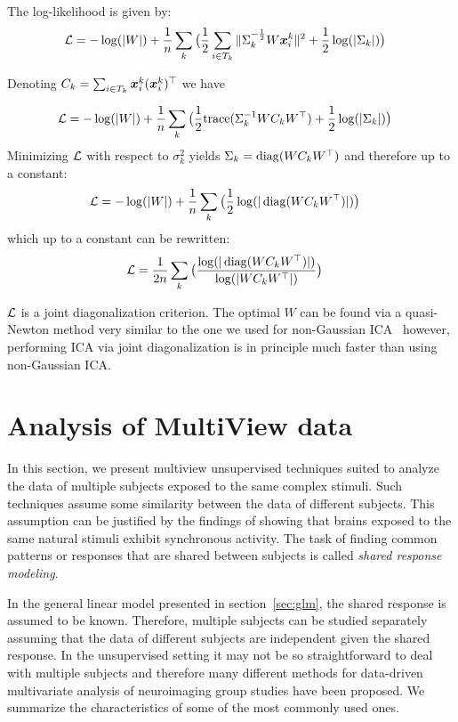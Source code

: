 The log-likelihood is given by:
\begin{align}  
  \mathcal{L} &= -\log(|W|)  + \frac1{n} \sum_k \big( \frac12 \sum_{i \in T_k}\|\Sigma_k^{-\frac12} W \boldsymbol{x}^k_i \|^2 + \frac12 \log(|\Sigma_k|) \big)
\end{align}

Denoting $C_k = \sum_{i \in T_k} \boldsymbol{x}_i^k (\boldsymbol{x}_i^k)^{\top}$ we have 

\begin{align}  
  \mathcal{L} &= -\log(|W|)  + \frac1{n} \sum_k \big( \frac1{2} {\mathrm{ trace}}(\Sigma_k^{-1} W C_k W^{\top}) + \frac12 \log(|\Sigma_k|) \big)
\end{align}
Minimizing $\mathcal{L}$ with respect to $\sigma_k^2$ yields $\Sigma_k = \operatorname*{diag}(W C_k
W^{\top})$ and therefore up to a constant:
\begin{align}  
  \mathcal{L} &= -\log(|W|)  + \frac1{n} \sum_k \big(\frac12 \log(|\operatorname*{diag}(W C_k W^{\top})|) \big)
\end{align}
which up to a constant can be rewritten:
\begin{align}  
  \mathcal{L} &=\frac1{2n} \sum_k \big(\frac{\log(|\operatorname*{diag}(W C_k W^{\top})|)}{\log(|W C_k W^{\top}|)} \big)
\end{align}

$\mathcal{L}$ is a joint diagonalization criterion. The optimal $W$ can be found via a
quasi-Newton method very similar to the one we used for non-Gaussian
ICA~\cite{ablin2018beyond} however, performing ICA via joint diagonalization is
in principle much faster than using non-Gaussian ICA.

\section{Analysis of MultiView data}
In this section, we present multiview unsupervised techniques suited to
analyze the data of multiple subjects exposed to the same complex stimuli. Such
techniques assume some similarity between the data of different subjects. This
assumption can be justified by the findings of \cite{hasson2004intersubject} showing that brains exposed to the same natural stimuli exhibit synchronous activity.
The task of finding common patterns or responses that are shared between
subjects is called \emph{shared response modeling}.

In the general linear model presented in
section~\ref{sec:glm}, the shared response is assumed to be known. Therefore,
multiple subjects can be studied separately assuming that the data of different
subjects are independent given the shared response.
In the unsupervised setting it may not be so straightforward to deal with
multiple subjects and therefore many different
methods for data-driven multivariate analysis of neuroimaging group studies
have been proposed.
We summarize the characteristics of some of the most commonly used ones.


